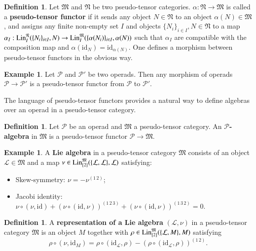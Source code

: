 \documentclass[12pt]{amsart}
\theoremstyle{definition}
\newtheorem{ex}[thm]{Example}
\newtheorem{defi}[thm]{Definition}
\newcommand{\huaL}{\mathcal{L}}
\newcommand{\huaP}{\mathcal{P}}
\newcommand{\huaO}{{\mathcal{O}}}
\newcommand{\frkM}{\mathfrak M}
\newcommand{\frkN}{\mathfrak N}
\newcommand{\id}{\mathrm{id}}
\newcommand{\dsN}{\mathds{N}}
\newcommand{\lin}{{\rm Lin}}
\newcommand{\cc}{\circ}
\begin{document}
 


\begin{defi}\cite{BD}
 Let $\frkM$ and $\frkN$ be two pseudo-tensor categories. $\alpha : \frkN \to \frkM$ is called a \textbf{pseudo-tensor functor} if it sends any object $N \in \frkN$ to an object $\alpha(N) \in \frkM$, and assigns any finite non-empty set $I$ and objects $\{N_i\}_{i \in I}, N\in \frkN$ to a map $\alpha_I : \lin_I^{\frkN}(\{N_i\}_{i\in I}, N) \to \lin_I^{\frkM}(\{\alpha(N_i)\}_{i\in I}, \alpha(N))$ such that $\alpha_I$ are compatible with the composition map and $\alpha(\mathrm{id}_N) = \mathrm{id}_{\alpha(N)}$. One defines a morphism between pseudo-tensor functors in the obvious way.
\end{defi}

\begin{ex}
Let $\huaP$ and $\huaP'$ be two operads. Then any morphism of operads $\huaP\to\huaP'$ is a pseudo-tensor functor from $\huaP$ to $\huaP'$.
\end{ex}

The language of pseudo-tensor functors provides a natural way to define algebras over an operad in a pseudo-tensor category.

\begin{defi}\cite{BD}\label{operad-alg-in-pt-cat}	
Let $\huaP$ be an operad and $\frkM$ a pseudo-tensor category. An {\bf$\huaP$-algebra} in $\frkM$ is a pseudo-tensor functor $\huaP\to \frkM$.
\end{defi}


\begin{ex}\cite{BDK,BKV}
A \textbf{Lie algebra} in a pseudo-tensor category $\frkM$ consists of an object $\huaL\in\frkM$ and a map $\nu \in \lin^\frkM_{[2]}(\{\huaL,\huaL\},\huaL)$ satisfying:
\begin{itemize}
  \item {Skew-symmetry}: $\nu = -\nu^{(1\,2)}$;
  \item {Jacobi identity}: $\nu\cc(\nu, \id)+(\nu\cc(\id, \nu))^{(1\,2\,3)}+(\nu\cc(\id, \nu))^{(1\,3\,2)}=0.$
\end{itemize}
\end{ex}

\begin{defi}\cite{BDK,BKV}
A \textbf{representation of a Lie algebra} $(\huaL, \nu)$ in a pseudo-tensor category $\frkM$ is an object $M$ together with
$\rho \in \lin_{[2]}^\frkM(\{\huaL, M\}, M)$ satisfying
$$
\rho\cc(\nu,\id_M) = \rho\cc(\id_\huaL, \rho) - (\rho\cc(\id_\huaL,\rho))^{(1\,2)}.
$$
\end{defi}
 
\end{document}
